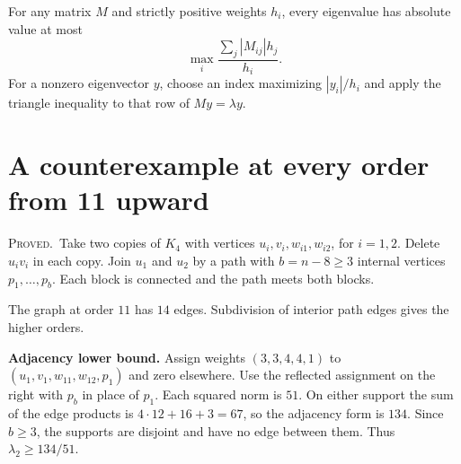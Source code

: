 \documentclass[11pt,a4paper]{article}
\newcommand{\proved}{\textsc{Proved.}}
\begin{document}
For any matrix $M$ and strictly positive weights $h_i$, every eigenvalue has absolute value at most
\begin{equation}\label{eq:rows}
\max_i\frac{\sum_j |M_{ij}|h_j}{h_i}.
\end{equation}
For a nonzero eigenvector $y$, choose an index maximizing $|y_i|/h_i$ and apply the triangle inequality to that row of $My=\lambda y$.

\section{A counterexample at every order from 11 upward}

\proved\ Take two copies of $K_4$ with vertices $u_i,v_i,w_{i1},w_{i2}$, for $i=1,2$. Delete $u_iv_i$ in each copy. Join $u_1$ and $u_2$ by a path with $b=n-8\ge3$ internal vertices $p_1,\ldots,p_b$. Each block is connected and the path meets both blocks.

\begin{center}

\small The graph at order $11$ has $14$ edges. Subdivision of interior path edges gives the higher orders.
\end{center}

\textbf{Adjacency lower bound.} Assign weights $(3,3,4,4,1)$ to $(u_1,v_1,w_{11},w_{12},p_1)$ and zero elsewhere. Use the reflected assignment on the right with $p_b$ in place of $p_1$. Each squared norm is $51$. On either support the sum of the edge products is $4\cdot12+16+3=67$, so the adjacency form is $134$. Since $b\ge3$, the supports are disjoint and have no edge between them. Thus $\lambda_2\ge134/51$.
\end{document}
